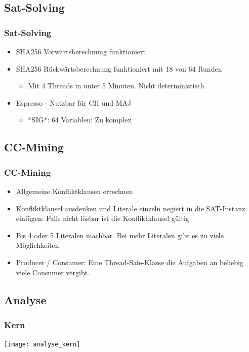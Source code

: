\documentclass{beamer}
\begin{document}
\subsection{Sat-Solving}
  \begin{frame}
    \frametitle{Sat-Solving}
    \begin{itemize}
      \item SHA256 Vorwärtsberechnung funktioniert
      \item SHA256 Rückwärtsberechnung \newline funktioniert mit 18 von 64 Runden
      \begin{itemize}
        \item Mit 4 Threads in unter 5 Minuten. Nicht deterministisch.
      \end{itemize}
      \item Espresso - Nutzbar für CH und MAJ
      \begin{itemize}
        \item *SIG*: 64 Variablen: Zu komplex
      \end{itemize}
    \end{itemize}
  \end{frame}
\subsection{CC-Mining}
  \begin{frame}
    \frametitle{CC-Mining}
    \begin{itemize}
     \item Allgemeine Konfliktklausen errechnen
     \item Konfliktklausel ausdenken und Literale einzeln negiert in die SAT-Instanz einfügen: Falls nicht lösbar ist die Konfliktklausel gültig
     \item Bis 4 oder 5 Literalen machbar. Bei mehr Literalen gibt es zu viele Möglichkeiten
     \item Producer / Consumer: Eine Thread-Safe-Klasse die Aufgaben an beliebig viele Consumer vergibt.
    \end{itemize}
  \end{frame}
\subsection{Analyse}
  \begin{frame}
    \frametitle{Kern}
    \texttt{[image: analyse\_kern]}
  \end{frame}
\end{document}
